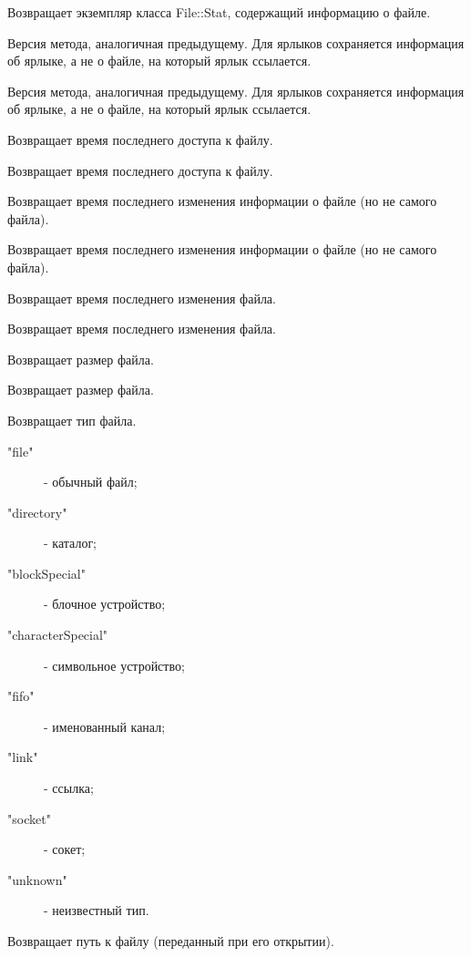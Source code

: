 \begin{methodlist}
  Возвращает экземпляр класса File::Stat, содержащий информацию о файле. 

  Версия метода, аналогичная предыдущему. Для ярлыков сохраняется информация об ярлыке, а не о файле, на который ярлык ссылается.

  Версия метода, аналогичная предыдущему. Для ярлыков сохраняется информация об ярлыке, а не о файле, на который ярлык ссылается.

  Возвращает время последнего доступа к файлу.

  Возвращает время последнего доступа к файлу. 

  Возвращает время последнего изменения информации о файле (но не самого файла).

  Возвращает время последнего изменения информации о файле (но не самого файла).

  Возвращает время последнего изменения файла.

  Возвращает время последнего изменения файла.

  Возвращает размер файла.

  Возвращает размер файла.

  Возвращает тип файла. 
  \begin{description}
    \item["file"] - обычный файл; 
    \item["directory"] - каталог; 
    \item["blockSpecial"] - блочное устройство; 
    \item["characterSpecial"] - символьное устройство; 
    \item["fifo"] - именованный канал; 
    \item["link"] - ссылка; 
    \item["socket"] - сокет; 
    \item["unknown"] - неизвестный тип.
  \end{description}

  Возвращает путь к файлу (переданный при его открытии). 
\end{methodlist}

